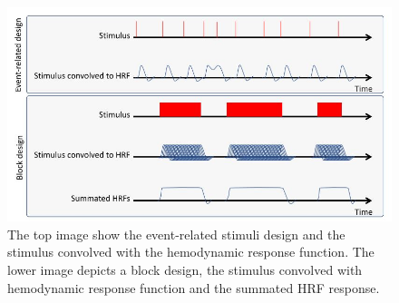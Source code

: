 \begin{figure}[H]                 
	\includegraphics[width=.8\textwidth]{figures/aBackground/event_vs_block}  
	\caption{The top image show the event-related stimuli design and the stimulus convolved with the hemodynamic response function. The lower image depicts a block design, the stimulus convolved with hemodynamic response function and the summated HRF response.  \cite{Moayedi2018}}
	\label{fig:back:e_vs_b} 
\end{figure}

 

